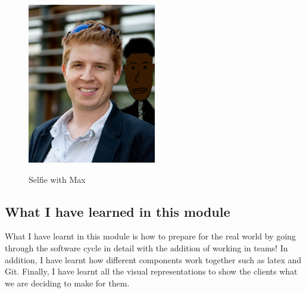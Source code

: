 \begin{figure}[h]
\caption{Selfie with Max}
\centering
\includegraphics[width=0.5\textwidth]{maxSelfie.jpg}
\label{fig:selfie}
\end{figure}


\subsection{What I have learned in this module}
What I have learnt in this module is how to prepare for the real world by going through the software cycle in detail with the addition of working in teams! In addition, I have learnt how different components work together such as latex and Git. Finally, I have learnt all the visual representations to show the clients what we are deciding to make for them. 

